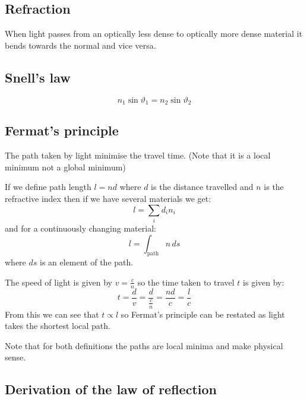 \subsection*{Refraction}

\begin{center}
\end{center}

When light passes from an optically less dense to optically more dense material it bends towards the normal and vice versa.

\subsection*{Snell's law}

\[n_1\sin\vartheta_1=n_2\sin\vartheta_2\]

\subsection*{Fermat's principle}

The path taken by light minimise the travel time. (Note that it is a local minimum not a global minimum)

If we define path length \(l=nd\) where \(d\) is the distance travelled and \(n\) is the refractive index then if we have several materials we get:
\[l=\sum_id_in_i\]
and for a continuously changing material:
\[l=\int_{\text{path}}n\,ds\]
where \(ds\) is an element of the path.

The speed of light is given by \(v=\frac cn\) so the time taken to travel \(t\) is given by:
\[t=\frac dv=\frac{d}{\frac{c}{n}}=\frac{nd}{c}=\frac lc\]
From this we can see that \(t\propto l\) so Fermat's principle can be restated as light takes the shortest local path.

Note that for both definitions the paths are local minima and make physical sense.

\subsection*{Derivation of the law of reflection}

